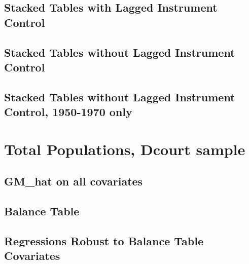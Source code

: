 \documentclass{article}
\begin{document}
\subsection{Stacked Tables with Lagged Instrument Control}



\clearpage


\clearpage

\subsection{Stacked Tables without Lagged Instrument Control}


\clearpage


\clearpage

\subsection{Stacked Tables without Lagged Instrument Control, 1950-1970 only}


\clearpage


\clearpage


\section{Total Populations, Dcourt sample}
\subsection{GM\_hat on all covariates}

\clearpage
\subsection{Balance Table}

\clearpage
\subsection{Regressions Robust to Balance Table Covariates}
\begin{landscape}

\clearpage

\clearpage

\clearpage

\clearpage
\end{landscape}
\end{document}
